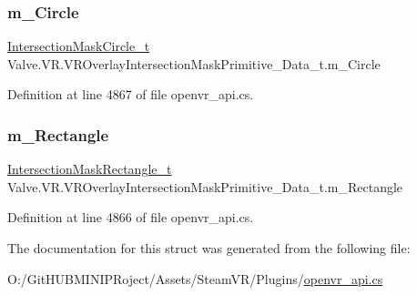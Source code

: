 \subsubsection{\texorpdfstring{m\_Circle}{m\_Circle}}
{\footnotesize\ttfamily \mbox{\hyperlink{struct_valve_1_1_v_r_1_1_intersection_mask_circle__t}{Intersection\+Mask\+Circle\+\_\+t}} Valve.\+V\+R.\+V\+R\+Overlay\+Intersection\+Mask\+Primitive\+\_\+\+Data\+\_\+t.\+m\+\_\+\+Circle}



Definition at line 4867 of file openvr\+\_\+api.\+cs.

\mbox{\label{struct_valve_1_1_v_r_1_1_v_r_overlay_intersection_mask_primitive___data__t_af8e6184ad0bcc0413c4143428a6e9db6}} 
\subsubsection{\texorpdfstring{m\_Rectangle}{m\_Rectangle}}
{\footnotesize\ttfamily \mbox{\hyperlink{struct_valve_1_1_v_r_1_1_intersection_mask_rectangle__t}{Intersection\+Mask\+Rectangle\+\_\+t}} Valve.\+V\+R.\+V\+R\+Overlay\+Intersection\+Mask\+Primitive\+\_\+\+Data\+\_\+t.\+m\+\_\+\+Rectangle}



Definition at line 4866 of file openvr\+\_\+api.\+cs.



The documentation for this struct was generated from the following file\+:\begin{DoxyCompactItemize}
\item 
O\+:/\+Git\+H\+U\+B\+M\+I\+N\+I\+P\+Roject/\+Assets/\+Steam\+V\+R/\+Plugins/\mbox{\hyperlink{openvr__api_8cs}{openvr\+\_\+api.\+cs}}\end{DoxyCompactItemize}

